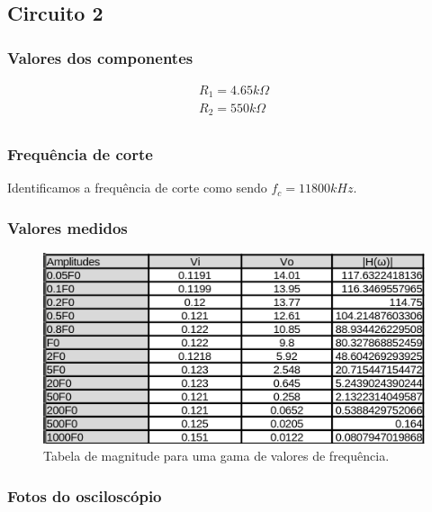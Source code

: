 \documentclass[12pt,twoside, a4paper, twocolumn]{article}
\begin{document}
\subsection{Circuito 2}


\subsubsection{Valores dos componentes}


\begin{equation}
    \begin{aligned}
        R_1 = 4.65k \varOmega \\
        R_2 = 550k \varOmega  \\
    \end{aligned}
\end{equation}


\subsubsection{Frequência de corte}


Identificamos a frequência de corte como sendo $f_c = 11800 kHz$.


\subsubsection{Valores medidos}


\begin{figure}[h]
    \centering
    \includegraphics[width=1\columnwidth]{images/valores2.png}
    \caption{Tabela de magnitude para uma gama de valores de frequência.}
\end{figure}


\subsubsection{Fotos do osciloscópio}
\end{document}
